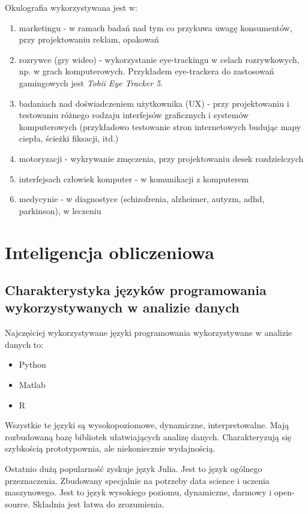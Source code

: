 \documentclass[wi]{zut}
\begin{document}
Okulografia wykorzystywana jest w:

\begin{enumerate}
    \item marketingu - w ramach badań nad tym co przykuwa uwagę konsumentów, przy projektowaniu reklam, opakowań
    \item rozrywce (gry wideo) - wykorzystanie eye-trackingu w celach rozrywkowych, np. w grach komputerowych. Przykładem eye-trackera do zastosowań gamingowych jest \textit{Tobii Eye Tracker 5}.
    \item badaniach nad doświadczeniem użytkownika (UX) - przy projektowaniu i testowaniu różnego rodzaju interfejsów graficznych i systemów komputerowych (przykładowo testowanie stron internetowych budując mapy ciepła, ścieżki fiksacji, itd.)
    \item motoryzacji - wykrywanie zmęczenia, przy projektowaniu desek rozdzielczych
    \item interfejsach człowiek komputer - w komunikacji z komputerem 
    \item medycynie - w diagnostyce (schizofrenia, alzheimer, autyzm, adhd, parkinson), w leczeniu
\end{enumerate}

\section{Inteligencja obliczeniowa}

\subsection{Charakterystyka języków programowania wykorzystywanych w analizie danych}

Najczęściej wykorzystywane języki programowania wykorzystywane w analizie danych to:

\begin{itemize}
    \item Python
    \item Matlab
    \item R
\end{itemize}

Wszystkie te języki są wysokopoziomowe, dynamiczne, interpretowalne. Mają rozbudowaną bazę bibliotek ułatwiających analizę danych. Charakteryzują się szybkością prototypownia, ale niekoniecznie wydajnością.

Ostatnio dużą popularność zyskuje język Julia. Jest to język ogólnego przeznaczenia. Zbudowany specjalnie na potrzeby data science i uczenia maszynowego. Jest to język wysokiego poziomu, dynamiczne, darmowy i open-source. Składnia jest łatwa do zrozumienia. 
\end{document}
